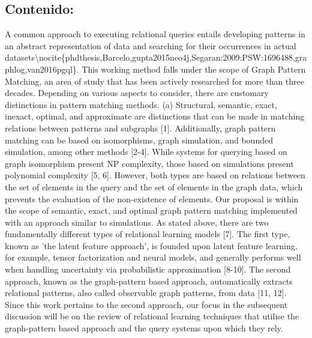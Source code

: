 \documentclass{article}%
\begin{document}
\subsection{Contenido:}%
\label{subsec:Contenido}%
A common approach to executing relational queries entails developing patterns in an abstract representation of data and searching for their occurrences in actual datasets\textbackslash{}nocite\{phdthesis,Barcelo,gupta2015neo4j,Segaran:2009:PSW:1696488,graphlog,van2016pgql\}. This working method falls under the scope of Graph Pattern Matching, an area of study that has been actively researched for more than three decades. Depending on various aspects to consider, there are customary distinctions in pattern matching methods. (a) Structural, semantic, exact, inexact, optimal, and approximate are distinctions that can be made in matching relations between patterns and subgraphs {[}1{]}. Additionally, graph pattern matching can be based on isomorphisms, graph simulation, and bounded simulation, among other methods {[}2{-}4{]}. While systems for querying based on graph isomorphism present NP complexity, those based on simulations present polynomial complexity {[}5, 6{]}. However, both types are based on relations between the set of elements in the query and the set of elements in the graph data, which prevents the evaluation of the non{-}existence of elements. Our proposal is within the scope of semantic, exact, and optimal graph pattern matching implemented with an approach similar to simulations.\newline%
\newline%
As stated above, there are two fundamentally different types of relational learning models {[}7{]}. The first type, known as 'the latent feature approach', is founded upon latent feature learning, for example, tensor factorization and neural models, and generally performs well when handling uncertainty via probabilistic approximation {[}8{-}10{]}. The second approach, known as the graph{-}pattern based approach, automatically extracts relational patterns, also called observable graph patterns, from data {[}11, 12{]}. Since this work pertains to the second approach, our focus in the subsequent discussion will be on the review of relational learning techniques that utilise the graph{-}pattern based approach and the query systems upon which they rely.\newline%
\newline%
\end{document}
